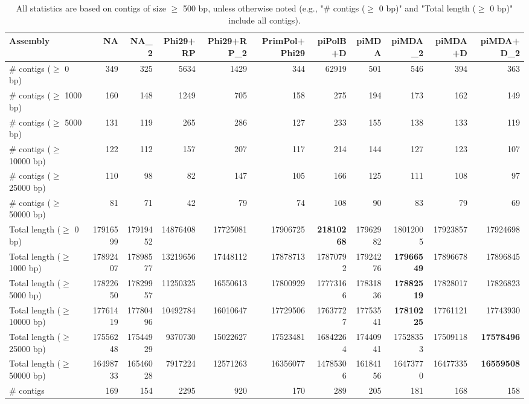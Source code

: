 \documentclass[12pt,a4paper]{article}
\begin{document}
\begin{table}[ht]
\begin{center}
\caption{All statistics are based on contigs of size $\geq$ 500 bp, unless otherwise noted (e.g., "\# contigs ($\geq$ 0 bp)" and "Total length ($\geq$ 0 bp)" include all contigs).}
\begin{tabular}{|l*{10}{|r}|}
\hline
Assembly & NA & NA\_2 & Phi29+RP & Phi29+RP\_2 & PrimPol+Phi29 & piPolB+D & piMDA & piMDA\_2 & piMDA+D & piMDA+D\_2 \\ \hline
\# contigs ($\geq$ 0 bp) & 349 & 325 & 5634 & 1429 & 344 & 62919 & 501 & 546 & 394 & 363 \\ \hline
\# contigs ($\geq$ 1000 bp) & 160 & 148 & 1249 & 705 & 158 & 275 & 194 & 173 & 162 & 149 \\ \hline
\# contigs ($\geq$ 5000 bp) & 131 & 119 & 265 & 286 & 127 & 233 & 155 & 138 & 133 & 119 \\ \hline
\# contigs ($\geq$ 10000 bp) & 122 & 112 & 157 & 207 & 117 & 214 & 144 & 127 & 123 & 107 \\ \hline
\# contigs ($\geq$ 25000 bp) & 110 & 98 & 82 & 147 & 105 & 166 & 125 & 111 & 108 & 97 \\ \hline
\# contigs ($\geq$ 50000 bp) & 81 & 71 & 42 & 79 & 74 & 108 & 90 & 83 & 79 & 69 \\ \hline
Total length ($\geq$ 0 bp) & 17916599 & 17919452 & 14876408 & 17725081 & 17906725 & {\bf 21810268} & 17962982 & 18012005 & 17923857 & 17924698 \\ \hline
Total length ($\geq$ 1000 bp) & 17892407 & 17898577 & 13219656 & 17448112 & 17878713 & 17870792 & 17924276 & {\bf 17966549} & 17896678 & 17896845 \\ \hline
Total length ($\geq$ 5000 bp) & 17822650 & 17829957 & 11250325 & 16550613 & 17800929 & 17773166 & 17831836 & {\bf 17882519} & 17828017 & 17826823 \\ \hline
Total length ($\geq$ 10000 bp) & 17761419 & 17780496 & 10492784 & 16010647 & 17729506 & 17637727 & 17753541 & {\bf 17810225} & 17761121 & 17743930 \\ \hline
Total length ($\geq$ 25000 bp) & 17556248 & 17544929 & 9370730 & 15022627 & 17523481 & 16842264 & 17440941 & 17528353 & 17509118 & {\bf 17578496} \\ \hline
Total length ($\geq$ 50000 bp) & 16498733 & 16546028 & 7917224 & 12571263 & 16356077 & 14785306 & 16184156 & 16473770 & 16477335 & {\bf 16559508} \\ \hline
\# contigs & 169 & 154 & 2295 & 920 & 170 & 289 & 205 & 181 & 168 & 158 \\ \hline

\end{tabular}
\end{center}
\end{table}
\end{document}
